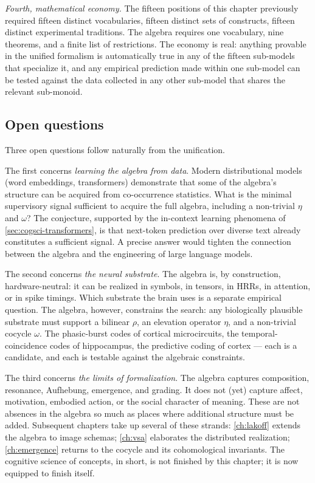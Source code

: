 \emph{Fourth, mathematical economy.} The fifteen positions of this
chapter previously required fifteen distinct vocabularies, fifteen
distinct sets of constructs, fifteen distinct experimental traditions.
The algebra requires one vocabulary, nine theorems, and a finite list
of restrictions. The economy is real: anything provable in the unified
formalism is automatically true in any of the fifteen sub-models that
specialize it, and any empirical prediction made within one
sub-model can be tested against the data collected in any other
sub-model that shares the relevant sub-monoid.

\subsection*{Open questions}

Three open questions follow naturally from the unification.

The first concerns \emph{learning the algebra from data}. Modern
distributional models (word embeddings, transformers) demonstrate that
some of the algebra's structure can be acquired from co-occurrence
statistics. What is the minimal supervisory signal sufficient to
acquire the full algebra, including a non-trivial $\eta$ and
$\omega$? The conjecture, supported by the in-context learning
phenomena of \cref{sec:cogsci-transformers}, is that next-token
prediction over diverse text already constitutes a sufficient signal.
A precise answer would tighten the connection between the algebra
and the engineering of large language models.

The second concerns \emph{the neural substrate}. The algebra is, by
construction, hardware-neutral: it can be realized in symbols, in
tensors, in HRRs, in attention, or in spike timings. Which substrate
the brain uses is a separate empirical question. The algebra, however,
constrains the search: any biologically plausible substrate must
support a bilinear $\rho$, an elevation operator $\eta$, and a
non-trivial cocycle $\omega$. The phasic-burst codes of cortical
microcircuits, the temporal-coincidence codes of hippocampus, the
predictive coding of cortex --- each is a candidate, and each is
testable against the algebraic constraints.

The third concerns \emph{the limits of formalization}. The algebra
captures composition, resonance, Aufhebung, emergence, and grading.
It does not (yet) capture affect, motivation, embodied action, or
the social character of meaning. These are not absences in the
algebra so much as places where additional structure must be added.
Subsequent chapters take up several of these strands: \cref{ch:lakoff}
extends the algebra to image schemas; \cref{ch:vsa} elaborates the
distributed realization; \cref{ch:emergence} returns to the cocycle
and its cohomological invariants. The cognitive science of concepts,
in short, is not finished by this chapter; it is now equipped to
finish itself.

